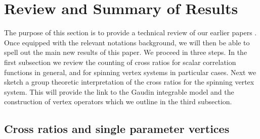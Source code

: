 \documentclass{article}
\begin{document}
\section{Review and Summary of Results} 
\label{sect:reviewsummary}

The purpose of this section is to provide a technical review of our earlier 
papers \cite{Buric:2020dyz,Buric:2021ywo}. Once equipped with the relevant notations 
background, we will then be able to spell out the main new results of this paper. 
We proceed in three steps. In the first subsection we review the counting of cross 
ratios for scalar correlation functions in general, and for spinning vertex systems in 
particular cases. Next we sketch a group theoretic interpretation of the cross 
ratios for the spinning vertex system. This will provide the link to the Gaudin 
integrable model and the construction of vertex operators which we outline in 
the third subsection.  

\subsection{Cross ratios and single parameter vertices}
\end{document}
